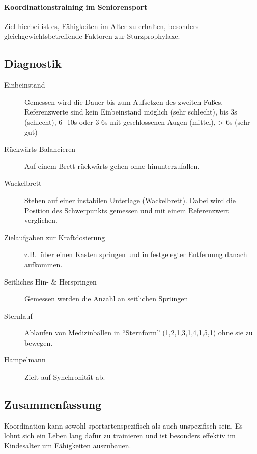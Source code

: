 \paragraph{Koordinationstraining im Seniorensport} Ziel hierbei ist es, Fähigkeiten im Alter zu erhalten, besonders gleichgewichtsbetreffende Faktoren zur Sturzprophylaxe.

\subsection{Diagnostik}
\begin{description}
  \item[Einbeinstand] Gemessen wird die Dauer bis zum Aufsetzen des zweiten Fußes.
    Referenzwerte sind kein Einbeinstand möglich (sehr schlecht), bis 3s (schlecht), 6 -10s oder 3-6s mit geschlossenen Augen (mittel), > 6s (sehr gut)
  \item[Rückwärts Balancieren] Auf einem Brett rückwärts gehen ohne hinunterzufallen.
  \item[Wackelbrett] Stehen auf einer instabilen Unterlage (Wackelbrett). Dabei wird die Position des Schwerpunkts gemessen und mit einem Referenzwert verglichen.
  \item[Zielaufgaben zur Kraftdosierung] z.B.\ über einen Kasten springen und in festgelegter Entfernung danach aufkommen.
  \item[Seitliches Hin- \& Herspringen] Gemessen werden die Anzahl an seitlichen Sprüngen
  \item[Sternlauf] Ablaufen von Medizinbällen in ``Sternform'' (1,2,1,3,1,4,1,5,1) ohne sie zu bewegen.
  \item[Hampelmann] Zielt auf Synchronität ab.
\end{description}

\subsection{Zusammenfassung}
Koordination kann sowohl sportartenspezifisch als auch unspezifisch sein.
Es lohnt sich ein Leben lang dafür zu trainieren und ist besonders effektiv im Kindesalter um Fähigkeiten auszubauen.

